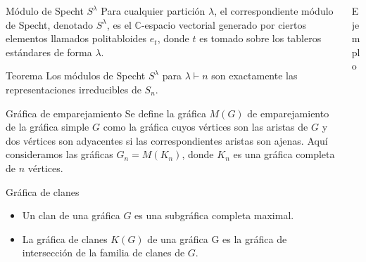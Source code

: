 \documentclass[final,xcolor=svgnames]{beamer}
\begin{document}
\begin{frame}{}
\begin{columns}
\begin{column}{0.5\textwidth}
      \begin{block}{Módulo de Specht $S^{\lambda}$}
        Para cualquier partición $\lambda$, el correspondiente
        \alert{módulo de Specht}, denotado $S^{\lambda}$, es el
        $\mathbb{C}$-espacio vectorial generado por ciertos elementos llamados
        politabloides $e_{t}$, donde $t$ es tomado sobre los
        tableros estándares de forma
        $\lambda$.

      \end{block} 

       \begin{block}{Teorema}
         Los módulos de Specht $S^{\lambda}$ para $\lambda\vdash n$
         son exactamente las representaciones irreducibles de
         $S_{n}$.
     \end{block}

     \begin{block}{Gráfica de emparejamiento}
       Se define la \alert{gráfica $M(G)$ de emparejamiento} de la gráfica
       simple $G$ como la gráfica cuyos vértices son las aristas de
       $G$ y dos vértices son adyacentes si las correspondientes
       aristas son ajenas. Aquí consideramos las gráficas
       $G_{n}=M(K_{n})$, donde $K_{n}$ es una gráfica completa de $n$ vértices.
     \end{block}
     
     \begin{block}{Gráfica de clanes}
       \begin{itemize}
       \item Un \alert{clan} de una gráfica $G$ es una subgráfica completa maximal. 
       \item La \alert{gráfica de clanes $K(G)$} de una gráfica G es la gráfica de intersección de
         la familia de clanes de $G$.   
       \end{itemize}
     \end{block}
      
    \end{column}

    \begin{column}{0.5\textwidth}
      \begin{block}{Ejemplo}
        \begin{minipage}{0.3\linewidth} 
          \centering
          

\end{minipage}
\end{block}
\end{column}
\end{columns}
\end{frame}
\end{document}
